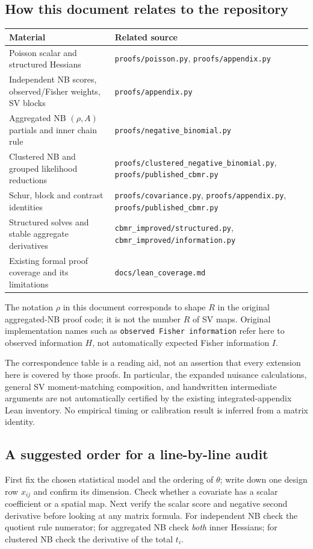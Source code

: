 \documentclass[11pt,a4paper]{article}
\numberwithin{equation}{section}
\begin{document}
\subsection{How this document relates to the repository}
\begin{center}\small
\begin{tabularx}{\textwidth}{T T}
\toprule
Material & Related source\\
\midrule
Poisson scalar and structured Hessians &
\texttt{proofs/poisson.py}, \texttt{proofs/appendix.py}\\
Independent NB scores, observed/Fisher weights, SV blocks &
\texttt{proofs/appendix.py}\\
Aggregated NB $(\rho,A)$ partials and inner chain rule &
\texttt{proofs/negative\_binomial.py}\\
Clustered NB and grouped likelihood reductions &
\texttt{proofs/clustered\_negative\_binomial.py},
\texttt{proofs/published\_cbmr.py}\\
Schur, block and contrast identities &
\texttt{proofs/covariance.py}, \texttt{proofs/appendix.py},
\texttt{proofs/published\_cbmr.py}\\
Structured solves and stable aggregate derivatives &
\texttt{cbmr\_improved/structured.py},
\texttt{cbmr\_improved/information.py}\\
Existing formal proof coverage and its limitations &
\texttt{docs/lean\_coverage.md}\\
\bottomrule
\end{tabularx}
\end{center}
The notation $\rho$ in this document corresponds to shape $R$ in the
original aggregated-NB proof code; it is not the number $R$ of SV maps.
Original implementation names such as \texttt{observed Fisher information}
refer here to observed information $H$, not automatically expected
Fisher information $I$.

The correspondence table is a reading aid, not an assertion that every
extension here is covered by those proofs. In particular, the expanded
nuisance calculations, general SV moment-matching composition, and
handwritten intermediate arguments are not automatically certified by
the existing integrated-appendix Lean inventory.
No empirical timing or calibration result is inferred from a matrix identity.

\subsection{A suggested order for a line-by-line audit}
First fix the chosen statistical model and the ordering of $\theta$;
write down one design row $x_{ij}$ and confirm its dimension.
Check whether a covariate has a scalar coefficient or a spatial map.
Next verify the scalar score and negative second derivative before
looking at any matrix formula. For independent NB check the quotient
rule numerator; for aggregated NB check \emph{both} inner Hessians;
for clustered NB check the derivative of the total $t_i$.
\end{document}
